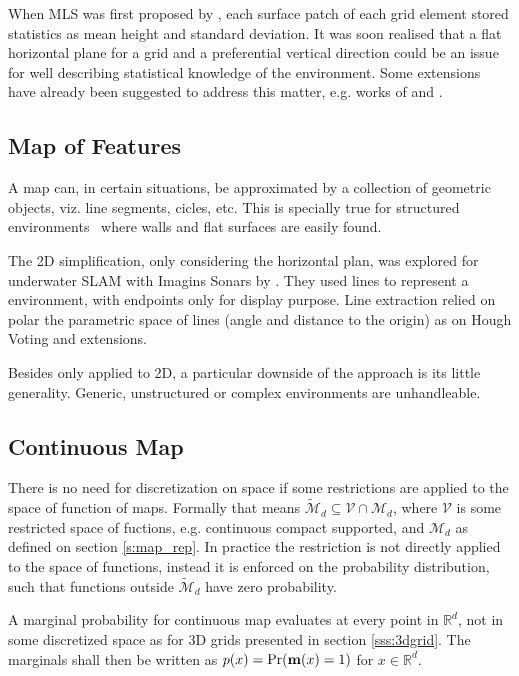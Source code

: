 When MLS was first proposed by \citet{triebel2006multi}, each surface patch of
each grid element stored statistics as mean height and standard deviation. It
was soon realised that a flat horizontal plane for a grid and a preferential
vertical direction could be an issue for well describing statistical knowledge
of the environment. Some extensions have already been suggested to address this
matter, e.g. works of \citet{rivadeneyra2011probabilistic} and
\citet{Schwendner2013}.

\subsection{Map of Features}

A map can, in certain situations, be approximated by a collection of geometric
objects, viz. line segments, cicles, etc. This is specially true for structured
environments~\cite{Ribas2006} where walls and flat surfaces are easily found.

The 2D simplification, only considering the horizontal plan, was explored for
underwater SLAM with Imagins Sonars by \citet{ribas2010underwater}. They used
lines to represent a environment, with endpoints only for display purpose. Line
extraction relied on polar the parametric space of lines (angle and distance to
the origin) as on Hough Voting and extensions.

Besides only applied to 2D, a particular downside of the approach is its little
generality. Generic, unstructured or complex environments are unhandleable.


\subsection{Continuous Map}

There is no need for discretization on space if some restrictions are applied to
the space of function of maps. Formally that means
$\tilde{\mathcal{M}}_d\subseteq\mathcal{V}\cap\mathcal{M}_d$, where $\mathcal{V}$
is some restricted space of fuctions, e.g. continuous compact supported, and
$\mathcal{M}_d$ as defined on section \ref{s:map_rep}. In practice the
restriction is not directly applied to the space of functions, instead it is
enforced on the probability distribution, such that functions outside
$\tilde{\mathcal{M}}_d$ have zero probability.

A marginal probability for continuous map evaluates at every point in
$\mathbb{R}^d$, not in some discretized space as for 3D grids presented in
section \ref{sss:3dgrid}. The marginals shall then be written as
$p(x)=\Pr(\mathrm{\mathbf{m}}(x)=1)$ for $x\in\mathbb{R}^d$.

